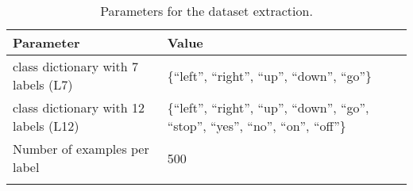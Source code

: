 \begin{table}[ht!]
\begin{center}
\caption{Parameters for the dataset extraction.}
\begin{tabular}{ M{7cm}  M{6cm}}
\toprule
\textbf{Parameter} & \textbf{Value} \\
\midrule
class dictionary with 7 labels (L7) & \{\enquote{left},  \enquote{right}, \enquote{up}, \enquote{down}, \enquote{go}\}\\
class dictionary with 12 labels (L12) & \{\enquote{left},  \enquote{right}, \enquote{up}, \enquote{down}, \enquote{go}, \enquote{stop}, \enquote{yes}, \enquote{no}, \enquote{on}, \enquote{off}\}\\
\midrule
Number of examples per label & 500 \\ 
\bottomrule
\label{tab:exp_details_params_dataset}
\end{tabular}
\end{center}
\vspace{-4mm}
\end{table}
\FloatBarrier
\noindent